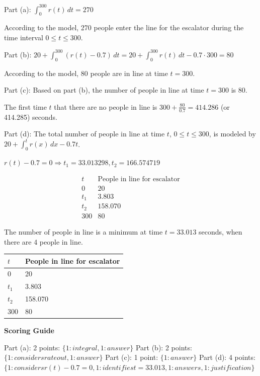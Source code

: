 \documentclass[12pt,addpoints,answers]{exam}
\begin{document}
\begin{questions}
\begin{solution}
Part (a): $\int_0^{300} r(t)\,dt = 270$ \par According to the model, 270 people enter the line for the escalator during the time interval $0 \le t \le 300$. \par Part (b): $20 + \int_0^{300} (r(t) - 0.7)\,dt = 20 + \int_0^{300} r(t)\,dt - 0.7 \cdot 300 = 80$ \par According to the model, 80 people are in line at time $t = 300$. \par Part (c): Based on part (b), the number of people in line at time $t = 300$ is 80. \par The first time $t$ that there are no people in line is $300 + \frac{80}{0.7} = 414.286$ (or 414.285) seconds. \par Part (d): The total number of people in line at time $t$, $0 \le t \le 300$, is modeled by $20 + \int_0^t r(x)\,dx - 0.7t$. \par $r(t) - 0.7 = 0 \Rightarrow t_1 = 33.013298, t_2 = 166.574719$ \par \[\begin{array}{c|c} t & \text{People in line for escalator} \\ \hline 0 & 20 \\ t_1 & 3.803 \\ t_2 & 158.070 \\ 300 & 80 \end{array}\] \par The number of people in line is a minimum at time $t = 33.013$ seconds, when there are 4 people in line.
\begin{center}
\begin{tabular}{|l|l|}
\hline
$t$ & People in line for escalator \\
\hline
0 & 20 \\
\hline
$t_1$ & 3.803 \\
\hline
$t_2$ & 158.070 \\
\hline
300 & 80 \\
\hline
\end{tabular}
\end{center}
\par\medskip
\textbf{Scoring Guide}\par
Part (a): 2 points: $\{1 : integral, 1 : answer\}$ Part (b): 2 points: $\{1 : considers rate out, 1 : answer\}$ Part (c): 1 point: $\{1 : answer\}$ Part (d): 4 points: $\{1 : considers r(t) - 0.7 = 0, 1 : identifies t = 33.013, 1 : answers, 1 : justification\}$
\end{solution}


\end{questions}
\end{document}
